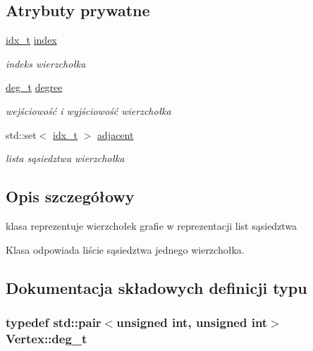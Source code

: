 \subsection*{Atrybuty prywatne}
\begin{DoxyCompactItemize}
\item 
\hyperlink{classVertex_a12fe2194264f72b70b284bba723052c1}{idx\-\_\-t} \hyperlink{classVertex_aa614f5224115d0d25abc2f8073b41758}{index}
\begin{DoxyCompactList}\small\item\em indeks wierzchołka \end{DoxyCompactList}\item 
\hyperlink{classVertex_a9dfe0aad480124fc2948013263615e2e}{deg\-\_\-t} \hyperlink{classVertex_ac1a6f322618b6d221822bc047b26ceea}{degree}
\begin{DoxyCompactList}\small\item\em wejściowość i wyjściowość wierzchołka \end{DoxyCompactList}\item 
std\-::set$<$ \hyperlink{classVertex_a12fe2194264f72b70b284bba723052c1}{idx\-\_\-t} $>$ \hyperlink{classVertex_a47b4f2e131ebb0bc19d9765032b14bbe}{adjacent}
\begin{DoxyCompactList}\small\item\em lista sąsiedztwa wierzchołka \end{DoxyCompactList}\end{DoxyCompactItemize}


\subsection{Opis szczegółowy}
klasa reprezentuje wierzchołek grafie w reprezentacji list sąsiedztwa 

Klasa odpowiada liście sąsiedztwa jednego wierzchołka. 

\subsection{Dokumentacja składowych definicji typu}
\hypertarget{classVertex_a9dfe0aad480124fc2948013263615e2e}{
\subsubsection[{deg\-\_\-t}]{\setlength{\rightskip}{0pt plus 5cm}typedef std\-::pair$<$unsigned int, unsigned int$>$ {\bf Vertex\-::deg\-\_\-t}}}\label{classVertex_a9dfe0aad480124fc2948013263615e2e}


